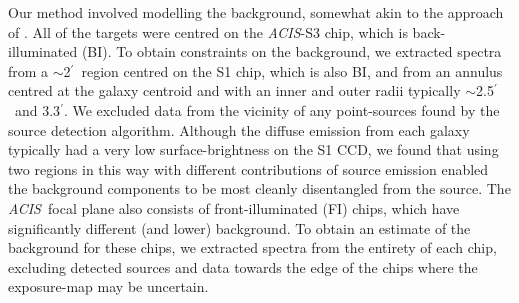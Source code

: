 \documentclass{emulateapj}
\def \arcmin {\hbox{$^\prime$}}
\newcommand{\acis }{{\em ACIS}}
\begin{document}
Our  method involved modelling the background, somewhat akin to
the approach of  \citet{buote04c}. All of the targets were centred on the 
\acis-S3 chip, which is back-illuminated (BI). To obtain constraints on the 
background, we extracted spectra from a 
$\sim$2\arcmin\ region centred on the S1 chip, which is also BI, and 
from an annulus centred at the galaxy centroid and with an inner and outer 
radii typically $\sim$2.5\arcmin\ and 3.3\arcmin. 
We excluded data from the vicinity
of any point-sources found by the source detection algorithm.
Although the diffuse emission from each galaxy typically had a very low 
surface-brightness on the S1 CCD, we found that using two regions 
in this way with different contributions of source emission enabled the 
background components to be most cleanly disentangled from the source.
The \acis\ focal plane also consists of front-illuminated (FI) chips, 
which have significantly different (and lower) background. 
To obtain an estimate of the background for these chips, 
we extracted spectra from the entirety of each chip, excluding 
detected sources and data towards the edge of the chips where the
exposure-map may be uncertain. 
\end{document}
